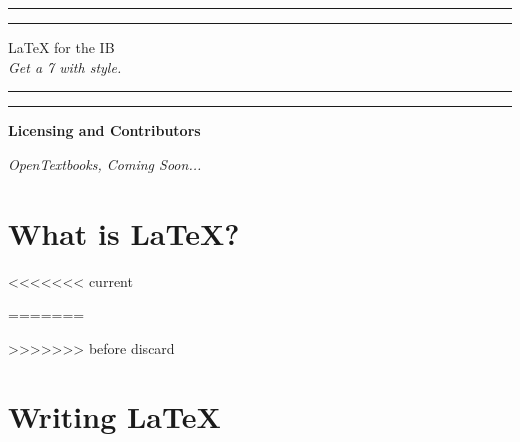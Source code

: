 \documentclass[12pt,a4paper]{article}
\begin{document}

\begin{titlepage}
\centering %
\scshape %
\vfill

\rule{\textwidth}{1.6pt}\vspace*{-\baselineskip}\vspace*{2pt}
\rule{\textwidth}{0.4pt}

\vspace{1.5\baselineskip} %
\LARGE{\LaTeX{} for the IB}\\
\vspace{0.2\baselineskip}
\small{\textit{Get a 7 with style.}}
\vspace{0.75\baselineskip} %

\rule{\textwidth}{0.4pt}\vspace*{-\baselineskip}\vspace{3.2pt}
\rule{\textwidth}{1.6pt}

\vfill
\end{titlepage}



\begin{center}
\Large{\textbf{Licensing and Contributors}}

\vfill
\small{\textit{OpenTextbooks, Coming Soon\texttrademark...}}
\vfill

\newpage
\end{center}

\begin{center}
\tableofcontents
\newpage
\end{center}


\section{What is LaTeX?}



<<<<<<< current

=======

>>>>>>> before discard

\newpage
\section{Writing LaTeX}
\end{document}
